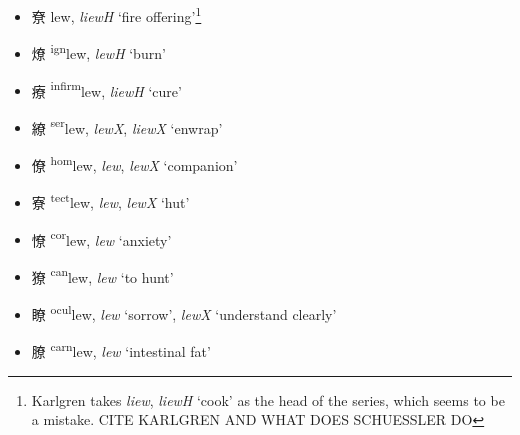 \begin{itemize}

   

    \item {\Large{尞}} %
    {\large{lew}},
    \textit{liewH}   `fire offering'\footnote{Karlgren takes %
    \textit{liew}, \textit{liewH} `cook' as the head of the series, which seems to be a mistake. CITE KARLGREN AND WHAT DOES SCHUESSLER DO}              %

    \item {\Large{燎}} %
    {\large{{\textsuperscript{ign}}lew}},
    \textit{lewH} `burn'                  %

    \item {\Large{療}} %
    {\large{{\textsuperscript{infirm}}lew}},
    \textit{liewH} `cure'                 %

    \item {\Large{繚}} %
    {\large{{\textsuperscript{ser}}lew}},
    \textit{lewX}, \textit{liewX} `enwrap'   %

    \item {\Large{僚}} %
    {\large{{\textsuperscript{hom}}lew}},
    \textit{lew}, \textit{lewX} `companion'       %

    \item {\Large{寮}} %
    {\large{{\textsuperscript{tect}}lew}},
    \textit{lew}, \textit{lewX} `hut'        %

    \item {\Large{憭}} %
    {\large{{\textsuperscript{cor}}lew}},
    \textit{lew} `anxiety'                   %

    \item {\Large{獠}} %
    {\large{{\textsuperscript{can}}lew}},
    \textit{lew} `to hunt'                   %

    \item {\Large{瞭}} %
    {\large{{\textsuperscript{ocul}}lew}},
    \textit{lew} `sorrow', \textit{lewX} `understand clearly'     %

    \item {\Large{膫}} %
    {\large{{\textsuperscript{carn}}lew}},
    \textit{lew} 
    `intestinal fat' 


\end{itemize}
